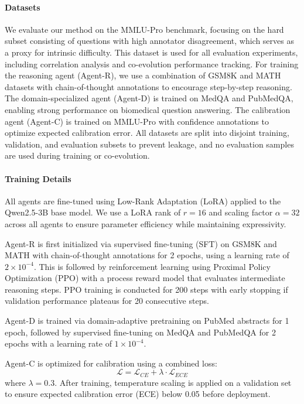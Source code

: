 \documentclass{article}
\begin{document}
\paragraph{Datasets}
We evaluate our method on the MMLU-Pro benchmark, focusing on the hard subset consisting of questions with high annotator disagreement, which serves as a proxy for intrinsic difficulty. This dataset is used for all evaluation experiments, including correlation analysis and co-evolution performance tracking. For training the reasoning agent (Agent-R), we use a combination of GSM8K and MATH datasets with chain-of-thought annotations to encourage step-by-step reasoning. The domain-specialized agent (Agent-D) is trained on MedQA and PubMedQA, enabling strong performance on biomedical question answering. The calibration agent (Agent-C) is trained on MMLU-Pro with confidence annotations to optimize expected calibration error. All datasets are split into disjoint training, validation, and evaluation subsets to prevent leakage, and no evaluation samples are used during training or co-evolution.
\paragraph{Training Details}
All agents are fine-tuned using Low-Rank Adaptation (LoRA) applied to the Qwen2.5-3B base model. We use a LoRA rank of $r=16$ and scaling factor $\alpha=32$ across all agents to ensure parameter efficiency while maintaining expressivity.

Agent-R is first initialized via supervised fine-tuning (SFT) on GSM8K and MATH with chain-of-thought annotations for 2 epochs, using a learning rate of $2 \times 10^{-4}$. This is followed by reinforcement learning using Proximal Policy Optimization (PPO) with a process reward model that evaluates intermediate reasoning steps. PPO training is conducted for 200 steps with early stopping if validation performance plateaus for 20 consecutive steps.

Agent-D is trained via domain-adaptive pretraining on PubMed abstracts for 1 epoch, followed by supervised fine-tuning on MedQA and PubMedQA for 2 epochs with a learning rate of $1 \times 10^{-4}$.

Agent-C is optimized for calibration using a combined loss:
\begin{equation}
\mathcal{L} = \mathcal{L}_{CE} + \lambda \cdot \mathcal{L}_{ECE}
\end{equation}
where $\lambda = 0.3$. After training, temperature scaling is applied on a validation set to ensure expected calibration error (ECE) below 0.05 before deployment.
\end{document}
